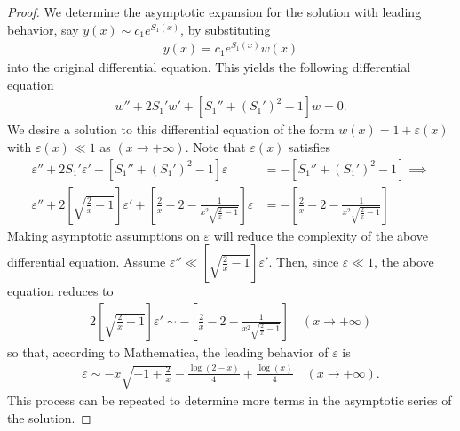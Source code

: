 \documentclass[12pt]{article}
\theoremstyle{definition}
\begin{document}
\begin{proof}
  We determine the asymptotic expansion for the solution with leading behavior, say $y(x) \sim c_1e^{S_1(x)}$,
  by substituting
  \begin{align*}
    y(x) = c_1 e^{S_1(x)}w(x)
  \end{align*}
  into the original differential equation.
  This yields the following differential equation
  \begin{align*}
    w'' + 2S_1' w' + [S_1'' + (S_1')^2-1]w = 0.
  \end{align*}
  We desire a solution to this differential equation of the form $w(x) = 1 + \varepsilon(x)$ with $\varepsilon(x) \ll 1$ as $(x\to+\infty)$. Note that $\varepsilon(x)$
  satisfies
  \begin{align*}
    \varepsilon'' + 2S_1' \varepsilon' + [S_1'' + (S_1')^2-1]\varepsilon &= -[S_1'' + (S_1')^2-1] \implies\\
    \varepsilon'' + 2\left[\sqrt{\frac{2}{x}-1}\right] \varepsilon' + \left[\frac{2}{x}-2-\frac{1}{x^2\sqrt{\frac{2}{x}-1}}\right]\varepsilon &= -\left[\frac{2}{x}-2-\frac{1}{x^2\sqrt{\frac{2}{x}-1}}\right]
  \end{align*}
  Making asymptotic assumptions on $\varepsilon$ will reduce the complexity of the
  above differential equation. Assume $\varepsilon'' \ll \left[\sqrt{\frac{2}{x}-1}\right] \varepsilon'$.
  Then, since $\varepsilon \ll 1$, the above equation reduces to
  \begin{align*}
    2\left[\sqrt{\frac{2}{x}-1}\right] \varepsilon' \sim -\left[\frac{2}{x}-2-\frac{1}{x^2\sqrt{\frac{2}{x}-1}}\right] \quad (x\to+\infty)
  \end{align*}
  so that, according to Mathematica, the leading behavior of $\varepsilon$ is
  \begin{align*}
    \varepsilon \sim - x\sqrt{-1 + \frac{2}{x}} - \frac{\log(2 - x)}{4} + \frac{\log(x)}{4} \quad (x\to+\infty).
  \end{align*}
  This process can be repeated to determine more terms in the asymptotic series of the solution.
\end{proof}
\end{document}
